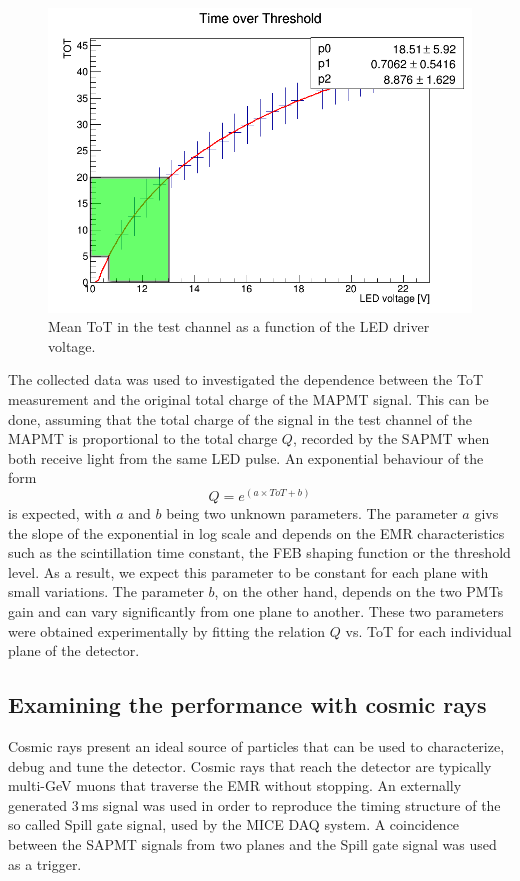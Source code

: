 \documentclass[a4paper,11pt]{article}
\begin{document}
\begin{figure}[htr!]
   \centering
   \includegraphics[width=.49\textwidth]{settings.png}
   \caption{Mean ToT in the test channel as a function of the LED driver voltage.}
   \label{fig:voltage}
\end{figure}

The collected data was used to investigated the dependence between the ToT measurement and the original total charge of the MAPMT signal. This can be done,
assuming that the total charge of the signal in the test channel of the MAPMT is proportional to the total charge $Q$, recorded by the SAPMT when both receive
light from the same LED pulse. An exponential behaviour of the form
\begin{equation}
 Q=e^{(a\times ToT+b)}
 \label{exp}
\end{equation}
is expected, with $a$ and $b$ being two unknown parameters. The parameter $a$ givs the slope of the exponential in log scale and depends on the EMR 
characteristics such as the scintillation time constant, the FEB shaping function or the threshold level. As a result, we expect this parameter to be
constant for each plane with small variations. The parameter $b$, on the other hand, depends on the two PMTs gain and can vary significantly from one
plane to another. These two parameters were obtained experimentally by fitting the relation $Q$ vs. ToT for each individual plane of the detector.

\subsection{Examining the performance with cosmic rays}\label{sec:cosmic_perf}
Cosmic rays present an ideal source of particles that can be used to characterize, debug and tune the detector. Cosmic rays that reach the detector are
typically multi-GeV muons that traverse the EMR without stopping. An externally generated 3\,ms signal was used in order to reproduce the timing structure
of the so called Spill gate signal, used by the MICE DAQ system. A coincidence between the SAPMT signals from two planes and the Spill gate signal was used
as a trigger.
\end{document}
